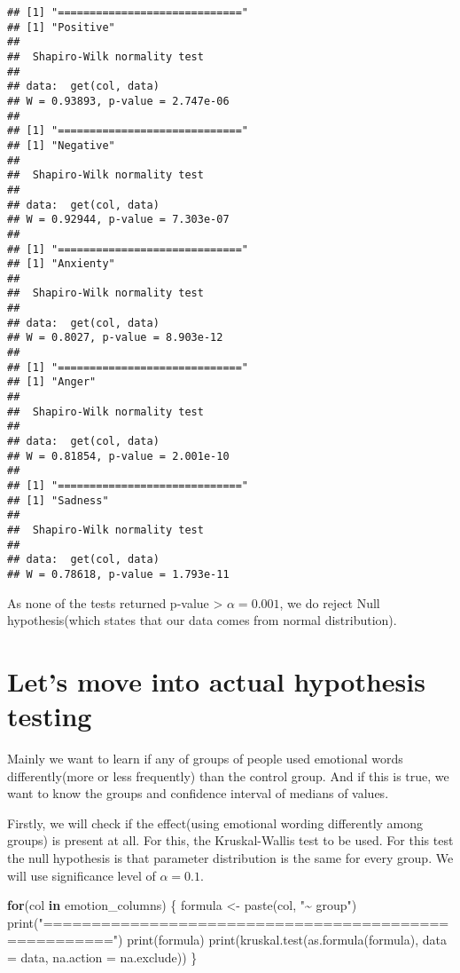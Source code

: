 \documentclass[
]{article}
\newenvironment{Shaded}{\begin{snugshade}}{\end{snugshade}}
\newcommand{\AttributeTok}[1]{\textcolor[rgb]{0.77,0.63,0.00}{#1}}
\newcommand{\ControlFlowTok}[1]{\textcolor[rgb]{0.13,0.29,0.53}{\textbf{#1}}}
\newcommand{\FunctionTok}[1]{\textcolor[rgb]{0.00,0.00,0.00}{#1}}
\newcommand{\NormalTok}[1]{#1}
\newcommand{\OtherTok}[1]{\textcolor[rgb]{0.56,0.35,0.01}{#1}}
\newcommand{\StringTok}[1]{\textcolor[rgb]{0.31,0.60,0.02}{#1}}
\begin{document}
\begin{verbatim}
## [1] "============================="
## [1] "Positive"
## 
##  Shapiro-Wilk normality test
## 
## data:  get(col, data)
## W = 0.93893, p-value = 2.747e-06
## 
## [1] "============================="
## [1] "Negative"
## 
##  Shapiro-Wilk normality test
## 
## data:  get(col, data)
## W = 0.92944, p-value = 7.303e-07
## 
## [1] "============================="
## [1] "Anxienty"
## 
##  Shapiro-Wilk normality test
## 
## data:  get(col, data)
## W = 0.8027, p-value = 8.903e-12
## 
## [1] "============================="
## [1] "Anger"
## 
##  Shapiro-Wilk normality test
## 
## data:  get(col, data)
## W = 0.81854, p-value = 2.001e-10
## 
## [1] "============================="
## [1] "Sadness"
## 
##  Shapiro-Wilk normality test
## 
## data:  get(col, data)
## W = 0.78618, p-value = 1.793e-11
\end{verbatim}

As none of the tests returned p-value \textgreater{} \(\alpha = 0.001\),
we do reject Null hypothesis(which states that our data comes from
normal distribution).

\hypertarget{lets-move-into-actual-hypothesis-testing}{%
\section{Let's move into actual hypothesis
testing}\label{lets-move-into-actual-hypothesis-testing}}

Mainly we want to learn if any of groups of people used emotional words
differently(more or less frequently) than the control group. And if this
is true, we want to know the groups and confidence interval of medians
of values.

Firstly, we will check if the effect(using emotional wording differently
among groups) is present at all. For this, the Kruskal-Wallis test to be
used. For this test the null hypothesis is that parameter distribution
is the same for every group. We will use significance level of
\(\alpha = 0.1\).

\begin{Shaded}
\begin{Highlighting}[]
\ControlFlowTok{for}\NormalTok{(col }\ControlFlowTok{in}\NormalTok{ emotion\_columns) \{}
\NormalTok{  formula }\OtherTok{\textless{}{-}} \FunctionTok{paste}\NormalTok{(col, }\StringTok{"\textasciitilde{} group"}\NormalTok{)}
  \FunctionTok{print}\NormalTok{(}\StringTok{"====================================================="}\NormalTok{)}
  \FunctionTok{print}\NormalTok{(formula)}
  \FunctionTok{print}\NormalTok{(}\FunctionTok{kruskal.test}\NormalTok{(}\FunctionTok{as.formula}\NormalTok{(formula), }\AttributeTok{data =}\NormalTok{ data, }\AttributeTok{na.action =}\NormalTok{ na.exclude))}
\NormalTok{\}}
\end{Highlighting}
\end{Shaded}
\end{document}
